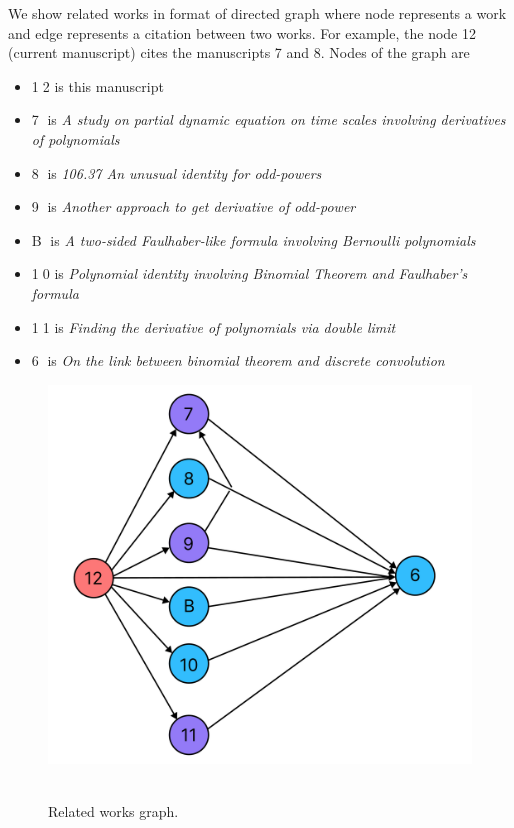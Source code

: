 We show related works in format of directed graph where node represents a work and edge represents a citation
between two works.
For example, the node 12 (current manuscript) cites the manuscripts 7 and 8.
Nodes of the graph are
\begin{itemize}
    \item {\Large \textcircled{\normalsize 12}} is this manuscript
    \item {\Large \textcircled{\normalsize 7}} is \textit{A study on partial dynamic equation on time scales involving derivatives
    of polynomials}~\cite{kolosov2016study}
    \item {\Large \textcircled{\normalsize 8}} is \textit{106.37 An unusual identity for odd-powers}~\cite{kolosov2022106}
    \item {\Large \textcircled{\normalsize 9}} is \textit{Another approach to get derivative of odd-power}~\cite{kolosov2023another}
    \item {\Large \textcircled{\normalsize B}} is \textit{A two-sided Faulhaber-like formula involving Bernoulli polynomials}~\cite{barbero2020two}
    \item {\Large \textcircled{\normalsize 10}} is \textit{Polynomial identity involving Binomial Theorem and Faulhaber's formula}~\cite{kolosov2023polynomial}
    \item {\Large \textcircled{\normalsize 11}} is \textit{Finding the derivative of polynomials via double limit}~\cite{kolosov_2024_10575485}
    \item {\Large \textcircled{\normalsize 6}} is \textit{On the link between binomial theorem and discrete convolution}~\cite{kolosov2016link}
\end{itemize}
\begin{figure}[H]
    \centering
    \includegraphics[width=1\textwidth]{images/realated_works_graph}
    ~\caption{Related works graph.}\label{fig:related-works-graph}
\end{figure}
